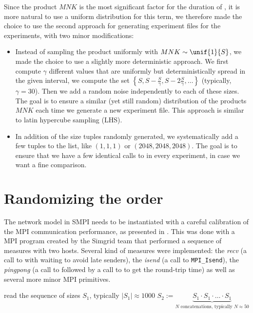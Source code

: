            Since the product \(MNK\) is the most significant factor for the duration of \dgemm, it is more natural to
            use a uniform distribution for this term, we therefore made the choice to use the second approach for
            generating experiment files for the \dgemm experiments, with two minor modifications:
            \begin{itemize}
                \item Instead of sampling the product uniformly with \(MNK\sim\unif{1}{S}\), we made the choice to use a
                    slightly more deterministic approach. We first compute $\gamma$ different values that are uniformly
                    but deterministically spread in the given interval, \ie we compute the set
                    \(\left\{S, S-\frac{S}{\gamma},S-2\frac{S}{\gamma}, \dots\right\}\)
                    (typically, \(\gamma=30\)). Then we add a random noise independently to each of these sizes. The
                    goal is to ensure a similar (yet still random) distribution of the products \(MNK\) each time we
                    generate a new experiment file. This approach is similar to latin hypercube sampling (LHS).
                \item In addition of the size tuples randomly generated, we systematically add a few tuples to the list,
                    like \((1,1,1)\) or \((2048,2048,2048)\). The goal is to ensure that we have a few identical calls to
                    \dgemm in every experiment, in case we want a fine comparison.
            \end{itemize}

    \section{Randomizing the order}%
    \label{sec:randomizing_order}
        The network model in SMPI needs to be instantiated with a careful calibration of the MPI communication
        performance, as presented in \cite{smpi}. This was done with a MPI program created by the Simgrid team that
        performed a sequence of measures with two hosts. Several kind of measures were implemented: the \emph{recv}
        (a call to \recv with waiting to avoid late senders), the \emph{isend} (a call to
        \texttt{MPI\_Isend}), the \emph{pingpong} (a call to \send followed by a call to \recv
        to get the round-trip time) as well as several more minor MPI primitives.

        \begin{algorithm}[H]
            read the sequence of sizes \(S_1\), typically \(|S_1| \approx 1000\)\;
            \(S_2 := \underbrace{S_1\cdot S_1\cdot\dots\cdot S_1}_{N\text{ concatenations, typically } N\approx 50}\)\;
        \end{algorithm}

